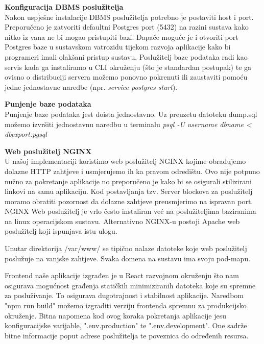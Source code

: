 			
			\noindent \textbf{Konfiguracija DBMS poslužitelja}\\
			
			\noindent Nakon uspješne instalacije DBMS poslužitelja potrebno je postaviti host i port. Preporučeno je zatvoriti defaultni Postgres port (5432) na razini sustava kako nitko iz vana ne bi mogao pristupiti bazi.
			Dapače moguće je i otvoriti port Postgres baze u sustavskom vatrozidu tijekom razvoja aplikacije kako bi programeri imali olakšani pristup sustavu.
			Poslužitelj baze podataka radi kao servis kada ga instaliramo u CLI okruženju (što je standardan postupak) te ga ovisno o distribuciji servera možemo ponovno pokrenuti ili zaustaviti pomoću jedne jednostavne naredbe (npr. \textit{service postgres start}).\newline
			
			
			\noindent \textbf{Punjenje baze podataka}\\
			
			\noindent Punjenje baze podataka jest doista jednostavno. Uz preuzetu datoteku dump.sql možemo izvršiti jednostavnu naredbu u terminalu \textit{psql -U username dbname < dbexport.pgsql}\newline
			
			
			\noindent \textbf{Web poslužitelj NGINX} \\
			
			\noindent U našoj implementaciji koristimo web poslužitelj NGINX kojime obrađujemo dolazne HTTP zahtjeve i usmjerujemo ih ka pravom odredištu. Ovo nije potpuno nužno za pokretanje aplikacije no preporučeno je kako bi se osigurali stilizirani linkovi na samu aplikaciju.
			Kod postavljanja tzv. Server blockova za poslužitelj moramo obratiti pozornost da dolazne zahtjeve preusmjerimo na ispravan port. NGINX Web poslužitelj je vrlo često instaliran već na poslužiteljima baziranima na linux operacijskom sustavu. Alternativno NGINX-u postoji Apache web poslužitelj koji ispunjava istu ulogu.
			
			 Unutar direktorija /var/www/ se tipično nalaze datoteke koje web poslužitelj poslužuje na vanjske zahtjeve. Svaka domena na sustavu ima svoju pod-mapu.
			
			 Frontend naše aplikacije izgrađen je u React razvojnom okruženju što nam osigurava mogućnost građenja statičkih minimiziranih datoteka koje su spremne za posluživanje. To osigurava dugotrajnost i stabilnost aplikacije. Naredbom "npm run build" možemo izgraditi verziju frontenda spremnu za produkcijsko okruženje.
			Bitna napomena kod ovog koraka pokretanja aplikacije jesu konfiguracijske varijable, ".env.production" te ".env.development". One sadrže bitne informacije poput adrese poslužitelja te poveznica do određenih resursa.
			
